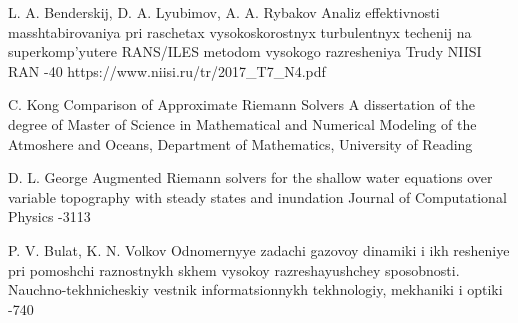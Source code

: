 \documentclass[utf8,english]{psta}%
\begin{document}
\begin{thebibliography}{30}
\by L. A. Benderskij, D. A. Lyubimov, A. A. Rybakov
\paper Analiz effektivnosti masshtabirovaniya pri raschetax vysokoskorostnyx turbulentnyx techenij na superkomp'yutere RANS/ILES metodom vysokogo razresheniya
\jour Trudy NIISI RAN
-40
\URL https://www.niisi.ru/tr/2017_T7_N4.pdf

\by C. Kong
\thesis Comparison of Approximate Riemann Solvers
\thesisinfo A dissertation of the degree of Master of Science in Mathematical and Numerical Modeling of the Atmoshere and Oceans, Department of Mathematics, University of Reading

\by D. L. George
\paper Augmented Riemann solvers for the shallow water equations over variable topography with steady states and inundation
\jour Journal of Computational Physics
-3113

\by P. V. Bulat, K. N. Volkov
\paper Odnomernyye zadachi gazovoy dinamiki i ikh resheniye pri pomoshchi raznostnykh skhem vysokoy razreshayushchey sposobnosti.
\jour Nauchno-tekhnicheskiy vestnik informatsionnykh tekhnologiy, mekhaniki i optiki
-740

\end{thebibliography}
\end{document}
